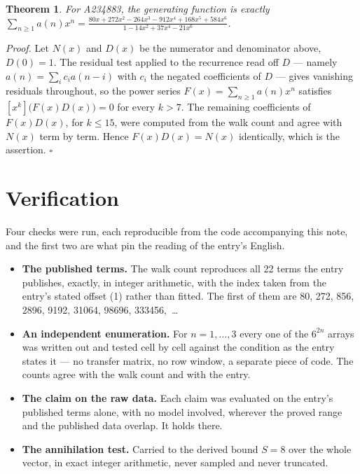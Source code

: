 \documentclass[11pt]{article}
\newtheorem{theorem}{Theorem}
\theoremstyle{definition}
\begin{document}
\begin{theorem} For A234883, the generating function is exactly $\sum_{n\ge 1} a(n)x^n = \frac{80x + 272x^{2} - 264x^{3} - 912x^{4} + 168x^{5} + 584x^{6}}{1 - 14x^{2} + 37x^{4} - 21x^{6}}$.\end{theorem}

{\itshape Proof.} Let $N(x)$ and $D(x)$ be the numerator and denominator above, $D(0)=1$. The residual test applied to the recurrence read off $D$ --- namely $a(n) = \sum_i c_i a(n-i)$ with $c_i$ the negated coefficients of $D$ --- gives vanishing residuals throughout, so the power series $F(x)=\sum_{n\ge 1}a(n)x^n$ satisfies $[x^k]\bigl(F(x)D(x)\bigr) = 0$ for every $k > 7$. The remaining coefficients of $F(x)D(x)$, for $k \le 15$, were computed from the walk count and agree with $N(x)$ term by term. Hence $F(x)D(x) = N(x)$ identically, which is the assertion. $\square$

\section{Verification}

Four checks were run, each reproducible from the code accompanying this note, and the first two are what pin the reading of the entry's English.

\begin{itemize}

\item {\bfseries The published terms.} The walk count reproduces all 22 terms the entry publishes, exactly, in integer arithmetic, with the index taken from the entry's stated offset (1) rather than fitted. The first of them are 80, 272, 856, 2896, 9192, 31064, 98696, 333456,~\dots

\item {\bfseries An independent enumeration.} For $n = 1,\dots,3$ every one of the $6^{2n}$ arrays was written out and tested cell by cell against the condition as the entry states it --- no transfer matrix, no row window, a separate piece of code. The counts agree with the walk count and with the entry.

\item {\bfseries The claim on the raw data.} Each claim was evaluated on the entry's published terms alone, with no model involved, wherever the proved range and the published data overlap. It holds there.

\item {\bfseries The annihilation test.} Carried to the derived bound $S = 8$ over the whole vector, in exact integer arithmetic, never sampled and never truncated.

\end{itemize}
\end{document}
